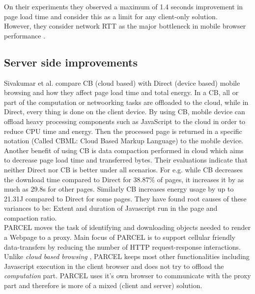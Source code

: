 \noindent On their experiments they observed a maximum of 1.4 seconds improvement in page load time and consider this as a limit for any client-only solution.\\
However, they consider network RTT as the major bottleneck in mobile browser performance . %
 
 \subsection {Server side improvements}
Sivakumar et al.\cite{cloud_hotmobile2014} compare CB (cloud based) with Direct (device based) mobile browsing and how they affect page load time and total energy. 
In a CB, all or part of the computation or netwoorking tasks are offloaded to the cloud, while in Direct, every thing is done on the client device.
By using CB, mobile device can offload heavy processing components such as JavaScript to the cloud in order to reduce CPU time and energy. Then the processed page is returned in a specific notation (Called CBML: Cloud Based Markup Language) to the mobile device. \\

\noindent Another benefit of using CB is data compaction performed in cloud which aims to decrease page load time and transferred bytes.
Their evaluations indicate that neither Direct nor CB is better under all scenarios. For e.g. while CB decreases the download time compared to Direct for 38.87\% of pages, it increases it by as much as 29.8s for other pages. Similarly CB increases energy usage by up to 21.31J compared to Direct for some pages.
They have found root causes of these variances to be: Extent and duration of Javascript run in the page and compaction ratio.\\

\noindent PARCEL\cite{parcel} moves the task of identifying and downloading objects needed to render a Webpage to a proxy. Main focus of PARCEL is to support cellular friendly data-transfers by reducing the number of HTTP request-response interactions. Unlike {\em cloud based browsing} \cite{cloud_hotmobile2014}, PARCEL keeps most other functionalities including Javascript execution in the client browser and does not try to offload the {\em computation} part.
PARCEL uses it's own browser to communicate with the proxy part and therefore is more of a mixed (client and server) solution.\\


